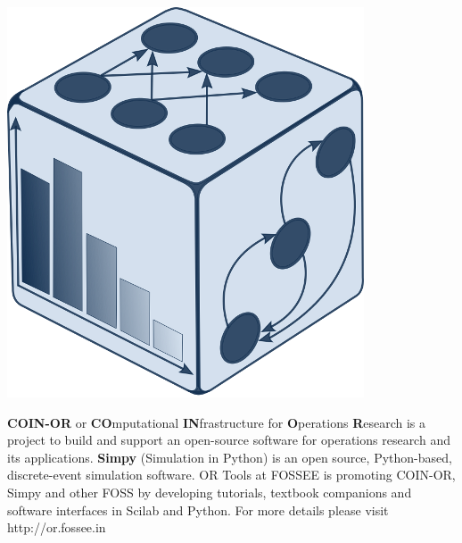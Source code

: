\documentclass{letter}
\begin{document}
\begin{minipage}[t]{0.5\linewidth}
    \begin{center}
        \includegraphics[width=0.3\linewidth]{images/coin_logo.png}
    \end{center}
\textbf{COIN-OR} or \textbf{CO}mputational \textbf{IN}frastructure for 
\textbf{O}perations \textbf{R}esearch is a project to build and support an 
open-source software for operations research and its applications.  
\textbf{Simpy} (Simulation in Python) is an open source, Python-based, 
discrete-event simulation software. OR Tools at FOSSEE is promoting COIN-OR, 
Simpy and other FOSS by developing tutorials, textbook companions and software 
interfaces in Scilab and Python. For more details please visit 
http://or.fossee.in
\end{minipage}
\end{document}
